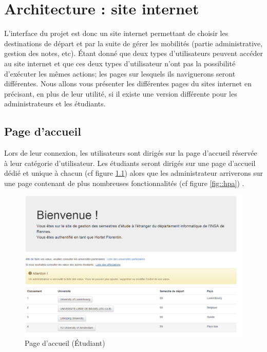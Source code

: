 \chapter{Architecture : site internet}

L'interface du projet est donc un site internet permettant de choisir les destinations de départ et par la suite de gérer les mobilités (partie administrative, gestion des notes, etc).
\bigbreak
Étant donné que deux types d'utilisateurs peuvent accéder au site internet et que ces deux types d'utilisateur n'ont pas la possibilité d'exécuter les mêmes actions; les pages sur lesquels ils naviguerons seront différentes.
\bigbreak
Nous allons vous présenter les différentes pages du sites internet en précisant, en plus de leur utilité, si il existe une version différente pour les administrateurs et les étudiants. 
\bigbreak


\section{Page d'accueil}

\bigbreak

Lors de leur connexion, les utilisateurs sont dirigés sur la page d'accueil réservée à leur catégorie d'utilisateur. Les étudiants seront dirigés sur une page d'accueil dédié et unique à chacun (cf figure \ref{fig::hps}) alors que les administrateur arriverons sur une page contenant de plus nombreuses fonctionnalités (cf figure \ref{fig::hpa}) .
 
\begin{figure}[H]
	\includegraphics[scale=0.35]{images/HPS.png}
	\caption{Page d'accueil (Étudiant)}
	\label{fig::hps}
\end{figure}

